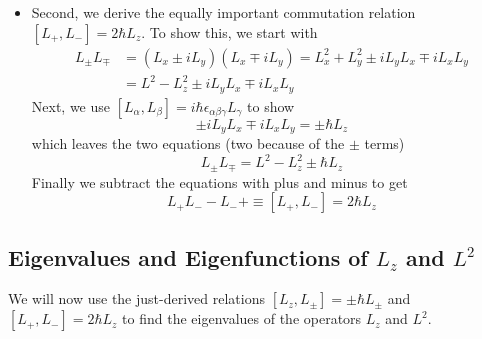 \documentclass[11pt, a4paper]{article}
\begin{document}
\begin{itemize}
	\item Second, we derive the equally important commutation relation $ [L_{+}, L_{-}] = 2\hbar L_{z} $. To show this, we start with
	\begin{align*}
 		L_{\pm}L_{\mp} &= (L_{x} \pm i L_{y})(L_{x} \mp i L_{y}) = L_{x}^{2} + L_{y}^{2} \pm i L_{y}L_{x} \mp i L_{x}L_{y} \\
 		& = L^{2} - L_{z}^{2} \pm i L_{y}L_{x} \mp i L_{x}L_{y} 
	\end{align*}
	Next, we use $ [L_{\alpha}, L_{\beta}] = i \hbar \epsilon_{\alpha \beta \gamma} L_{\gamma}  $ to show 
	\begin{equation*}
		\pm i L_{y}L_{x} \mp i L_{x}L_{y} = \pm \hbar L_{z}
	\end{equation*}
	which leaves the two equations (two because of the $ \pm $ terms)
	\begin{equation*}
		L_{\pm}L_{\mp} = L^{2} - L_{z}^{2} \pm \hbar L_{z}
	\end{equation*}
	Finally we subtract the equations with plus and minus to get
	\begin{equation*}
		L_{+}L_{-} - L_{-}{+}  \equiv [L_{+}, L_{-}] = 2 \hbar L_{z}
	\end{equation*}
	
\end{itemize}

\subsection{Eigenvalues and Eigenfunctions of $ L_{z} $ and $ L^{2} $}
We will now use the just-derived relations $ [L_{z}, L_{\pm}] = \pm \hbar L_{\pm} $ and $ [L_{+}, L_{-}] = 2 \hbar L_{z} $ to find the eigenvalues of the operators $ L_{z} $ and $ L^{2} $. 
\end{document}

